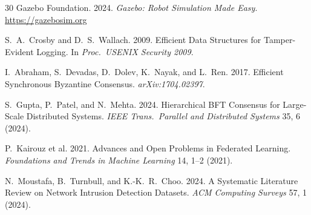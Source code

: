 \documentclass[sigconf,nonacm]{acmart}
\begin{document}
\begin{thebibliography}{30}
Gazebo Foundation. 2024. \textit{Gazebo: Robot Simulation Made
Easy}. \url{https://gazebosim.org}

S.~A.~Crosby and D.~S.~Wallach. 2009. Efficient Data Structures
for Tamper-Evident Logging. In \textit{Proc.\ USENIX Security 2009}.

I.~Abraham, S.~Devadas, D.~Dolev, K.~Nayak, and L.~Ren. 2017.
Efficient Synchronous Byzantine Consensus.
\textit{arXiv:1704.02397}.

S.~Gupta, P.~Patel, and N.~Mehta. 2024. Hierarchical BFT
Consensus for Large-Scale Distributed Systems.
\textit{IEEE Trans.\ Parallel and Distributed Systems} 35, 6
(2024).

P.~Kairouz et al. 2021. Advances and Open Problems in Federated
Learning. \textit{Foundations and Trends in Machine Learning} 14,
1--2 (2021).

N.~Moustafa, B.~Turnbull, and K.-K.~R.~Choo. 2024. A Systematic
Literature Review on Network Intrusion Detection Datasets.
\textit{ACM Computing Surveys} 57, 1 (2024).

\end{thebibliography}
\end{document}
